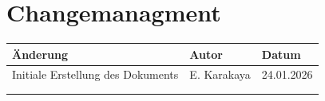 \chapter*{Changemanagment}

\begin{table}[h!]
\centering
\renewcommand{\arraystretch}{1.3}
\begin{tabular}{|p{7cm}|p{3cm}|p{3cm}|}
\hline
\textbf{Änderung} & \textbf{Autor} & \textbf{Datum} \\
\hline
Initiale Erstellung des Dokuments & E. Karakaya & 24.01.2026 \\
\hline
 &  &  \\
\hline
 &  &  \\
\hline
\end{tabular}
\end{table}
